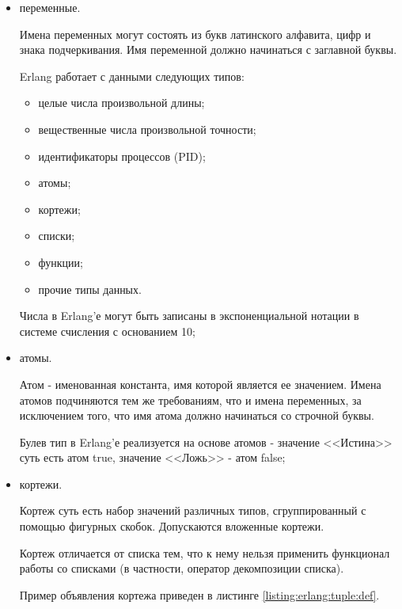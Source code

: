 \begin{itemize}

	\item переменные.

		Имена переменных могут состоять из букв латинского алфавита, цифр и знака подчеркивания. Имя переменной должно начинаться с заглавной буквы.

		Erlang работает с данными следующих типов:

		\begin{itemize}

			\item целые числа произвольной длины;
			\item вещественные числа произвольной точности;
			\item идентификаторы процессов (PID);
			\item атомы;
			\item кортежи;
			\item списки;
			\item функции;
			\item прочие типы данных.

		\end{itemize}

		Числа в Erlang'е могут быть записаны в экспоненциальной нотации в системе счисления с основанием 10;

	\item атомы.

		Атом - именованная константа, имя которой является ее значением. Имена атомов подчиняются тем же требованиям, что и имена переменных, за исключением того, что имя атома должно начинаться со строчной буквы.

		Булев тип в Erlang'е реализуется на основе атомов - значение <<Истина>> суть есть атом true, значение <<Ложь>> - атом false;

	\item кортежи.

		Кортеж суть есть набор значений различных типов, сгруппированный с помощью фигурных скобок. Допускаются вложенные кортежи.

		Кортеж отличается от списка тем, что к нему нельзя применить функционал работы со списками (в частности, оператор декомпозиции списка).

		Пример объявления кортежа приведен в листинге \ref{listing:erlang:tuple:def}.
		
\begin{lstlisting}


\end{lstlisting}
\end{itemize}
